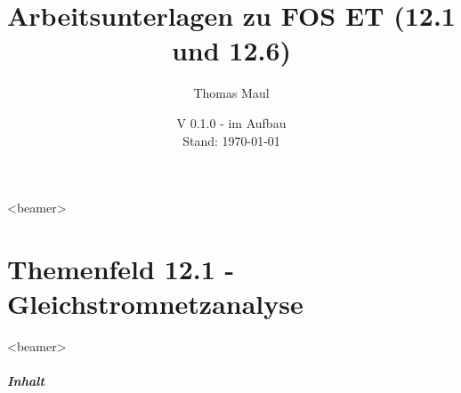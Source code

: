 \documentclass[aspectratio=169, ignorenonframetext]{beamer}
\title{Arbeitsunterlagen zu FOS ET (12.1 und 12.6)}
\date{V 0.1.0 - im Aufbau\\ Stand: \today}%
\institute[BWS Hofheim]{Brühlwiesenschule, Hofheim}
\author{Thomas Maul}
\begin{document}
\begin{frame}<beamer>
  \titlepage
\end{frame}


\part{Themenfeld 12.1 - Gleichstromnetzanalyse}
\begin{frame}
  \partpage
\end{frame}
\begin{frame}<beamer>
      \frametitle{Inhalt}
  \begin{columns}
    \tableofcontents[sections={1-3},hidesubsections]%
    \tableofcontents[sections={4-},hidesubsections]%
  \end{columns}
\end{frame}
\end{document}

